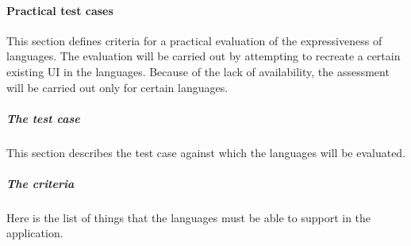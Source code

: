 \paragraph{Practical test cases}
This section defines criteria for a practical evaluation of the expressiveness of languages.
The evaluation will be carried out by attempting to recreate a certain existing UI in the languages.
Because of the lack of availability, the assessment will be carried out only for certain languages.

\subparagraph{The test case}
This section describes the test case against which the languages will be evaluated.

\subparagraph{The criteria}

Here is the list of things that the languages must be able to support in the application.

